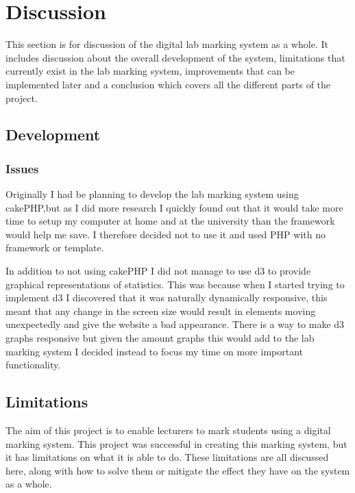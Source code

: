 \documentclass[11pt]{report}
\begin{document}
\newpage
\chapter{Discussion}

This section is for discussion of the digital lab marking system as a whole. It includes discussion about the overall development of the system, limitations that currently exist in the lab marking system, improvements that can be implemented later and a conclusion which covers all the different parts of the project.

\section{Development}

\subsection{Issues}

Originally I had be planning to develop the lab marking system using cakePHP,but as I did more research I quickly found out that it would take more time to setup my computer at home and at the university than the framework would help me save. I therefore decided  not to use it and used PHP with no framework or template.

In addition to not using cakePHP I did not manage to use d3 to provide graphical representations of statistics. This was because when I started trying to implement d3 I discovered that it was naturally dynamically responsive, this meant that any change in the screen size would result in elements moving unexpectedly and give the website a bad appearance. There is a way to make d3 graphs responsive but given the amount graphs this would add to the lab marking system I decided instead to focus my time on more important functionality. 



\section{Limitations}

The aim of this project is to enable lecturers to mark students using a digital marking system. This project was successful in creating this marking system, but it has limitations on what it is able to do. These limitations are all discussed here, along with how to solve them or mitigate the effect they have on the system as a whole.
\end{document}
